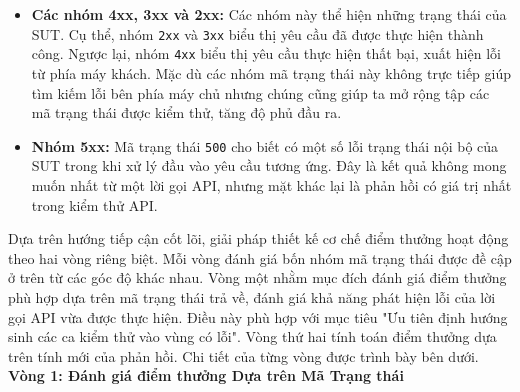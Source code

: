 \begin{itemize}
\item  \textbf{Các nhóm 4xx, 3xx và 2xx: }Các nhóm này thể hiện những trạng thái của SUT. Cụ thể, nhóm \texttt{2xx} và \texttt{3xx} biểu thị yêu cầu đã được thực hiện thành công. Ngược lại, nhóm \texttt{4xx} biểu thị yêu cầu thực hiện thất bại, xuất hiện lỗi từ phía máy khách. Mặc dù các nhóm mã trạng thái này không trực tiếp giúp tìm kiếm lỗi bên phía máy chủ nhưng chúng cũng giúp ta mở rộng tập các mã trạng thái được kiểm thử, tăng độ phủ đầu ra.

\item \textbf{Nhóm 5xx: }Mã trạng thái \texttt{500} cho biết có một số lỗi trạng thái nội bộ của SUT trong khi xử lý đầu vào yêu cầu tương ứng. Đây là kết quả không mong muốn nhất từ một lời gọi API, nhưng mặt khác lại là phản hồi có giá trị nhất trong kiểm thử API.
\end{itemize}

Dựa trên hướng tiếp cận cốt lõi, giải pháp thiết kế cơ chế điểm thưởng hoạt động theo hai vòng riêng biệt. Mỗi vòng đánh giá bốn nhóm mã trạng thái được đề cập ở trên từ các góc độ khác nhau. Vòng một nhằm mục đích đánh giá điểm thưởng phù hợp dựa trên mã trạng thái trả về, đánh giá khả năng phát hiện lỗi của lời gọi API vừa được thực hiện. Điều này phù hợp với mục tiêu "Ưu tiên định hướng sinh các ca kiểm thử vào vùng có lỗi". Vòng thứ hai tính toán điểm thưởng dựa trên tính mới của phản hồi. Chi tiết của từng vòng được trình bày bên dưới.\\

\noindent\textbf{Vòng 1: Đánh giá điểm thưởng Dựa trên Mã Trạng thái }

